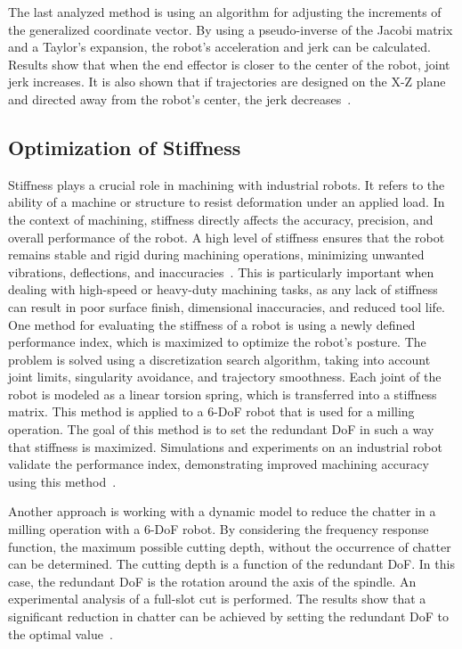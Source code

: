 The last analyzed method is using an algorithm for adjusting the increments of the generalized coordinate vector. By using a pseudo-inverse of the Jacobi matrix and a Taylor’s expansion, the robot's acceleration and jerk can be calculated. Results show that when the end effector is closer to the center of the robot, joint jerk increases. It is also shown that if trajectories are designed on the X-Z plane and directed away from the robot's center, the jerk decreases~\cite{Duong.2021}.

\subsection{Optimization of Stiffness}\label{OOS}
Stiffness plays a crucial role in machining with industrial robots. It refers to the ability of a machine or structure to resist deformation under an applied load. In the context of machining, stiffness directly affects the accuracy, precision, and overall performance of the robot. A high level of stiffness ensures that the robot remains stable and rigid during machining operations, minimizing unwanted vibrations, deflections, and inaccuracies~\cite{Wu.2022}. This is particularly important when dealing with high-speed or heavy-duty machining tasks, as any lack of stiffness can result in poor surface finish, dimensional inaccuracies, and reduced tool life. 
\newpage
One method for evaluating the stiffness of a robot is using a newly defined performance index, which is maximized to optimize the robot's posture. The problem is solved using a discretization search algorithm, taking into account joint limits, singularity avoidance, and trajectory smoothness. 
Each joint of the robot is modeled as a linear torsion spring, which is transferred into a stiffness matrix. This method is applied to a 6-\acrshort{DoF} robot that is used for a milling operation. The goal of this method is to set the redundant \acrshort{DoF} in such a way that stiffness is maximized. Simulations and experiments on an industrial robot validate the performance index, demonstrating improved machining accuracy using this method~\cite{Xiong.2019}.


Another approach is working with a dynamic model to reduce the chatter in a milling operation with a 6-\acrshort{DoF} robot. By considering the frequency response function, the maximum possible cutting depth, without the occurrence of chatter can be determined. The cutting depth is a function of the redundant \acrshort{DoF}. In this case, the redundant \acrshort{DoF} is the rotation around the axis of the spindle. An experimental analysis of a full-slot cut is performed. The results show that a significant reduction in chatter can be achieved by setting the redundant \acrshort{DoF} to the optimal value~\cite{Wang.2022}.

